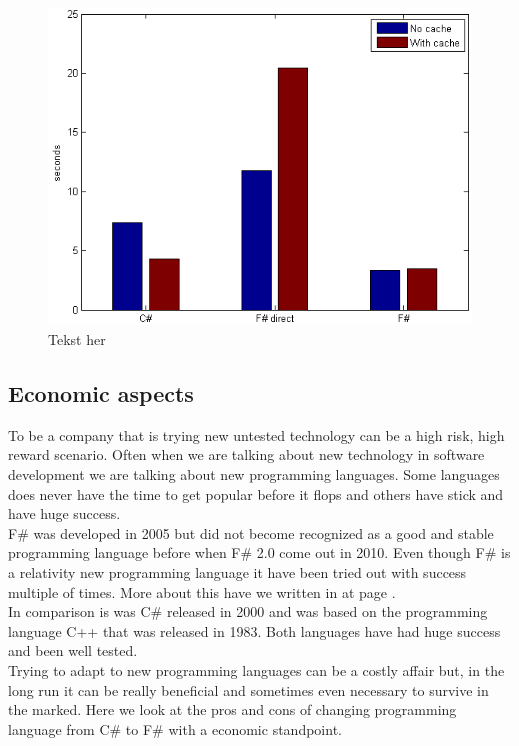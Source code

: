 \documentclass[12pt, a4paper]{article}
\begin{document}
\begin{figure}[!h]
    \includegraphics[scale=0.8]{averageChart1}
    \centering

    \caption{Tekst her}
\end{figure}

\newpage
\subsection{Economic aspects}

To be a company that is trying new untested technology can be a high risk, high reward scenario. Often when we are talking about new technology in software development we are talking about new programming languages. Some languages does never have the time to get popular before it flops and others have stick and have huge success.\\

F\# was developed in 2005 but did not become recognized as a good and stable programming language before when F\# 2.0 come out in 2010. Even though F\# is a relativity new programming language it have been tried out with success multiple of times. More about this have we written in  at page \pageref{Testimonials}.\\

In comparison is was C\# released in 2000 and was based on the programming language C++ that was released in 1983. Both languages have had huge success and been well tested.\\

Trying to adapt to new programming languages can be a costly affair but, in the long run it can be really beneficial and sometimes even necessary to survive in the marked. Here we look at the pros and cons of changing programming language from C\# to F\# with a economic standpoint.
\end{document}

